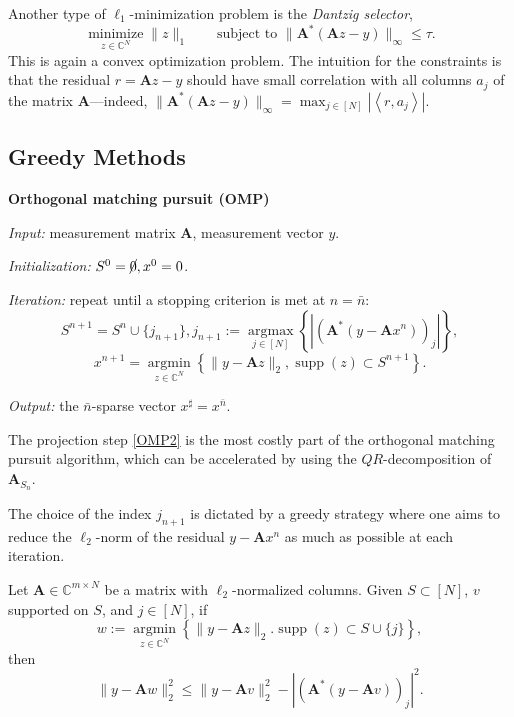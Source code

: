 Another type of $\ell_1$-minimization problem is the \emph{\textcolor[rgb]{1,0,0}{Dantzig selector}},
\begin{equation}
    \mathop{\mathrm{minimize}}\limits_{z \in \mathbb{C}^N} \|z\|_1 \qquad \text{subject to } \|\mathbf{A}^*(\mathbf{A}z - y)\|_{\infty} \leq \tau.
    \label{eq0.3.4}
\end{equation}
This is again a convex optimization problem. The intuition for the constraints is that the residual $r = \mathbf{A}z -y $ should have small correlation with all columns $a_j$ of the matrix $\mathbf{A}$---indeed, $\|\mathbf{A}^*(\mathbf{A}z -y)\|_{\infty} = \max_{j \in [N]} \left|\left<r, a_j\right>\right|$.  

\subsection{Greedy Methods}

\begin{mdframed}
    \label{OMP}
    \begin{center}
        \textbf{Orthogonal matching pursuit (OMP)}
    \end{center}
    \emph{Input:} measurement matrix $\mathbf{A}$, measurement vector $y$.

    \emph{Initialization: } $S^0 = \cancel{0}, x^0 = 0$. 
    
    \emph{Iteration:} repeat until a stopping criterion is met at $n = \bar{n}$:
    \begin{equation}
        S^{n+1} = S^n \cup \{j_{n+1}\}, j_{n+1} := \mathop{\mathrm{argmax}}\limits_{j \in [N]} \left\{ \left|(\mathbf{A}^*(y-\mathbf{A}x^n))_j\right| \right\}, \tag{$OMP_1$}
        \label{eqOMP1}
    \end{equation}
    \begin{equation}
        x^{n+1} = \mathop{\mathrm{argmin}}\limits_{z \in \mathbb{C}^N} \left\{ \|y - \mathbf{A}z\|_2,\mathop{\mathrm{supp}}(z) \subset S^{n+1} \right\}. \tag{$OMP_2$}
        \label{OMP2}
    \end{equation}

    \emph{Output:} the $\bar{n}$-sparse vector $x^{\sharp} = x^{\bar{n}}$.
\end{mdframed}

The projection step \cref{OMP2} is the most costly part of the orthogonal matching pursuit algorithm, which can be accelerated by using the $QR$-decomposition of $\mathbf{A}_{S_n}$. 

The choice of the index $j_{n+1}$ is dictated by a greedy strategy where one aims to reduce the $\ell_2$-norm of the residual $y - \mathbf{A}x^n$ as much as possible at each iteration. 

\begin{lemma}
    \label{lm0.3.3}
    Let $\mathbf{A} \in \mathbb{C}^{m \times N}$ be a matrix with $\ell_2$-normalized columns. Given $S \subset [N]$, $v$ supported on $S$, and $j \in [N]$, if 
    \[
        w := \mathop{\mathrm{argmin}}\limits_{z \in \mathbb{C}^N} \left\{ \|y-\mathbf{A}z\|_2. \mathop{\mathrm{supp}}(z) \subset S \cup \{j\} \right\},
    \]
    then
    \[
        \|y - \mathbf{A}w\|_2^2 \leq \|y-\mathbf{A}v\|_2^2- \left|(\mathbf{A}^*(y - \mathbf{A}v))_j\right|^2.
    \]
\end{lemma}
